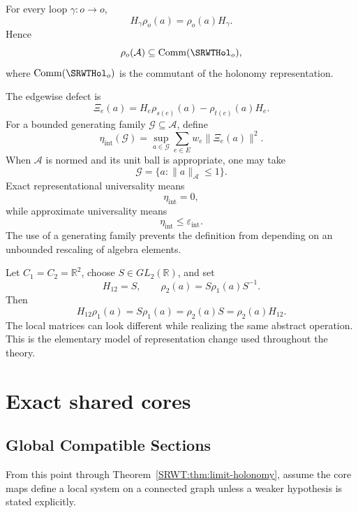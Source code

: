 \begin{SRWTcorollary}\label{SRWT:cor:holonomy-commutes}
For every loop \(\gamma:o\to o\),
\[
H_\gamma\rho_o(a)=\rho_o(a)H_\gamma.
\]
Hence
\[
\rho_o(\mathcal A)
\subseteq
\operatorname{Comm}(\SRWTHol_o),
\]
where \(\operatorname{Comm}(\SRWTHol_o)\) is the commutant of the holonomy
representation.
\end{SRWTcorollary}


The edgewise defect is
\[
\Xi_e(a)
=
H_e\rho_{s(e)}(a)-\rho_{t(e)}(a)H_e.
\]
For a bounded generating family \(\mathcal G\subseteq\mathcal A\), define
\[
\eta_{\mathrm{int}}(\mathcal G)
=
\sup_{a\in\mathcal G}
\sum_{e\in E}w_e\|\Xi_e(a)\|^2.
\]
When \(\mathcal A\) is normed and its unit ball is appropriate, one may take
\[
\mathcal G=\{a:\|a\|_{\mathcal A}\leq1\}.
\]
Exact representational universality means
\[
\eta_{\mathrm{int}}=0,
\]
while approximate universality means
\[
\eta_{\mathrm{int}}\leq\varepsilon_{\mathrm{int}}.
\]
The use of a generating family prevents the definition from depending on an
unbounded rescaling of algebra elements.

\begin{SRWTexample}\label{SRWT:ex:coordinate-intertwiner}
Let \(C_1=C_2=\mathbb R^2\), choose \(S\in GL_2(\mathbb R)\), and set
\[
H_{12}=S,
\qquad
\rho_2(a)=S\rho_1(a)S^{-1}.
\]
Then
\[
H_{12}\rho_1(a)
=S\rho_1(a)
=\rho_2(a)S
=\rho_2(a)H_{12}.
\]
The local matrices can look different while realizing the same abstract
operation. This is the elementary model of representation change used
throughout the theory.
\end{SRWTexample}


\chapter{Exact shared cores}\label{SRWT:book:chapter-69}


\section{Global Compatible Sections}

From this point through Theorem~\ref{SRWT:thm:limit-holonomy}, assume the core maps
define a local system on a connected graph unless a weaker hypothesis is
stated explicitly.

